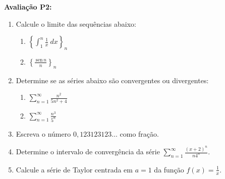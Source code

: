 \documentclass[a4paper,5pt]{amsbook}
\newcommand{\sen}{\,\mbox{sen}\,}
\newcommand{\ds}{\displaystyle}
\begin{document}
\vspace{0.5cm}
\textbf{Avalia\c{c}\~ao P2:}
\begin{enumerate}
	\vspace{0.5cm}
	\item Calcule o limite das sequ\^encias abaixo:
		\begin{enumerate}
			\vspace{0.3cm}
			\item $\left\{\ds\int_1^n \frac{1}{x}\ dx\right\}_n$
			\vspace{0.3cm}
			\item $\left\{\ds\frac{\sen{n}}{n}\right\}_n$
		\end{enumerate}
	\vspace{0.5cm}
	\item Determine se as s\'eries abaixo s\~ao convergentes ou divergentes:
		\begin{enumerate}
			\vspace{0.3cm}
			\item $\ds\sum_{n=1}^\infty \frac{n^2}{5n^2+4}$
			\vspace{0.3cm}
			\item $\ds\sum_{n=1}^\infty \frac{n^3}{5^n}$
		\end{enumerate}
	\vspace{0.5cm}
	\item Escreva o n\'umero $0,123123123\ldots$ como fra\c{c}\~ao.
	\vspace{0.5cm}
	\item Determine o intervalo de converg\^encia da s\'erie $\ds\sum_{n=1}^\infty \frac{{(x+2)}^n}{n4^n}$.
	\vspace{0.5cm}
	\item Calcule a s\'erie de Taylor centrada em $a = 1$ da fun\c{c}\~ao $\ds f(x) = \frac{1}{x}$.
\end{enumerate}
\end{document}

